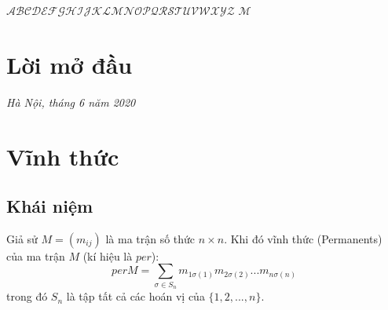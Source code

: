 \documentclass[a4paper, 12pt]{report}
\begin{document}
$\mathscr{ABCDEFGHIJKLMNOPQRSTUVWXYZ}$
$\mathcal{M}$
\chapter*{Lời mở đầu}





\hspace*{7cm}\textit{Hà Nội, tháng 6 năm 2020}
	
\hspace*{8cm}
	
\hspace*{9cm}
\chapter{Vĩnh thức}
\section{Khái niệm}
Giả sử $M= (m_{ij})$ là ma trận số thức $n \times n$. Khi đó vĩnh thức (Permanents) của ma trận $M$ (kí hiệu là $per$):
\begin{equation*}
per M = \displaystyle \sum_{\sigma \in S_{n}}m_{1\sigma(1)}m_{2\sigma(2)}...m_{n\sigma(n)}
\end{equation*}
trong đó $S_{n}$ là tập tất cả các hoán vị của $\{1,2,...,n\}$.
\end{document}
